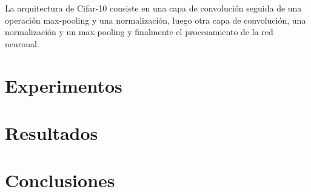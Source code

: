 \documentclass[10pt,twocolumn,letterpaper]{article}
\begin{document}
La arquitectura de Cifar-10 consiste en una capa de convolución seguida de una operación max-pooling y una normalización, luego otra capa de convolución, una normalización y un max-pooling y finalmente el procesamiento de la red neuronal.


\section{Experimentos}

\section{Resultados}

\section{Conclusiones}
\end{document}
